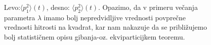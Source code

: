 \documentclass[slovene,11pt,a4paper]{article}
\numberwithin{equation}{section} %
\numberwithin{figure}{section} %
\numberwithin{table}{section} %
\begin{document}
\begin{figure}[!ht]
\begin{minipage}{0.5\textwidth}
\end{minipage}
\caption{Levo:$\langle p_1^2 \rangle (t) $, desno: $\langle p_2^2 \rangle (t)$. Opazimo, da v primeru večanja parametra $\lambda$ imamo bolj nepredvidljive vrednosti povprečne vrednosti hitrosti na kvadrat, kar nam nakazuje da se približujemo bolj statističnem opisu gibanja-oz. ekviparticijkem teoremu.}
\end{figure}
\end{document}
